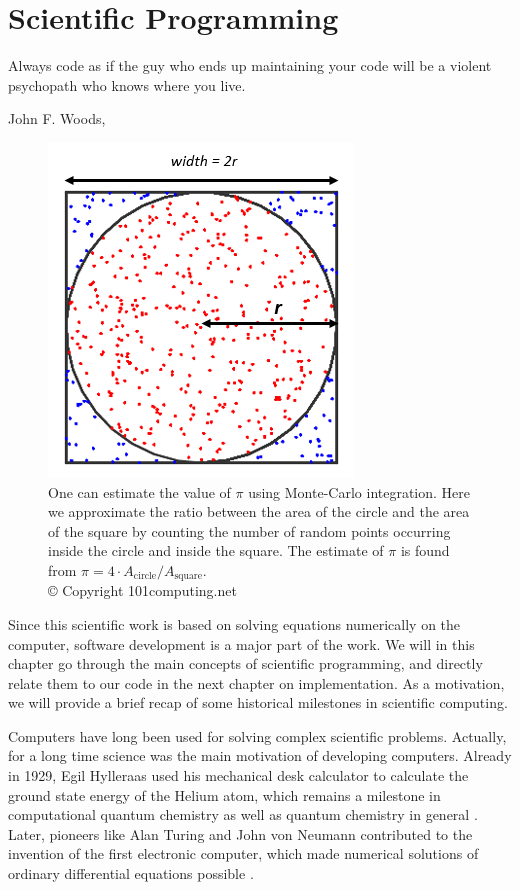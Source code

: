 \chapter{Scientific Programming} \label{chp:scientificprogramming}
\epigraph{Always code as if the guy who ends up maintaining your code will be a violent psychopath who knows where you live.}{John F. Woods, \cite{woods_usage_nodate}}
\begin{figure}[H]
	\centering
	\includegraphics[scale=0.9]{Images/montecarlointegration.png}
	\caption{One can estimate the value of $\pi$ using Monte-Carlo integration. Here we approximate the ratio between the area of the circle and the area of the square by counting the number of random points occurring inside the circle and inside the square. The estimate of $\pi$ is found from $\pi=4\cdot A_{\text{circle}}/A_{\text{square}}$.\\ © Copyright 101computing.net}
	\label{fig:montecarlointegration}
\end{figure}

Since this scientific work is based on solving equations numerically on the computer, software development is a major part of the work. We will in this chapter go through the main concepts of scientific programming, and directly relate them to our code in the next chapter on implementation. As a motivation, we will provide a brief recap of some historical milestones in scientific computing.

Computers have long been used for solving complex scientific problems. Actually, for a long time science was the main motivation of developing computers. Already in 1929, Egil Hylleraas used his mechanical desk calculator to calculate the ground state energy of the Helium atom, which remains a milestone in computational quantum chemistry as well as quantum chemistry in general \cite{helgaker_perspective_2000}. Later, pioneers like Alan Turing and John von Neumann contributed to the invention of the first electronic computer, which made numerical solutions of ordinary differential equations possible \cite{gustafsson_scientific_2018}. 

